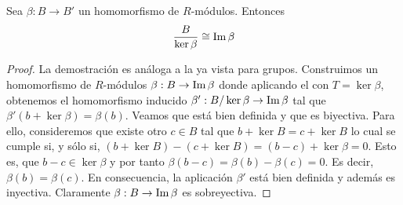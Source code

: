 %
%
%
\begin{teorema}
	\label{teo:first-iso}
	Sea $\beta : B \to B'$ un homomorfismo de $R$-módulos. Entonces
	\[
	\frac{B}{\ker \beta} \cong \operatorname{Im} \beta
	\]
\end{teorema}
\begin{proof}
	La demostración es análoga a la ya vista para grupos. Construimos un homomorfismo de $R$-módulos $\beta: B \to \operatorname{Im} \beta$ donde aplicando el  con $T = \ker \beta$, obtenemos el homomorfismo inducido $\beta' : B/\ker \beta \to \operatorname{Im} \beta$ tal que $\beta'(b+\ker \beta) = \beta(b)$. Veamos que está bien definida y que es biyectiva. Para ello, consideremos que existe otro $c \in B$ tal que $b + \ker B = c + \ker B$ lo cual se cumple si, y sólo si, $(b + \ker B) - (c + \ker B) = (b - c) + \ker \beta = 0$. Esto es, que $b - c \in \ker \beta$ y por tanto $\beta(b-c) = \beta(b) - \beta(c) = 0$. Es decir, $\beta(b) = \beta(c)$. En consecuencia, la aplicación $\beta'$ está bien definida y además es inyectiva. Claramente $\beta: B \to \operatorname{Im} \beta$ es sobreyectiva.
\end{proof}
